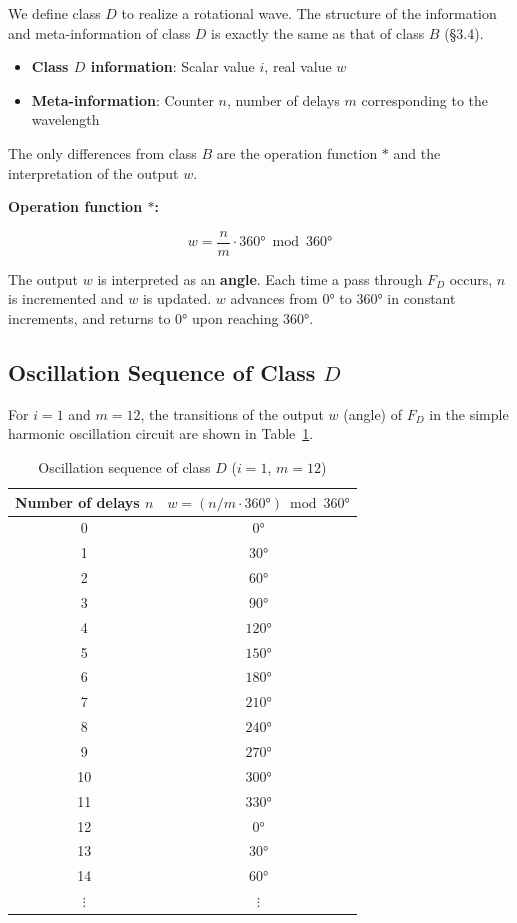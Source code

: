 \documentclass[12pt,a4paper]{article}
\begin{document}
We define class $D$ to realize a rotational wave. The structure of the information and
meta-information of class $D$ is exactly the same as that of class $B$ (\S3.4).

\begin{itemize}
  \item \textbf{Class $D$ information}: Scalar value $i$, real value $w$
  \item \textbf{Meta-information}: Counter $n$, number of delays $m$ corresponding to the
        wavelength
\end{itemize}

The only differences from class $B$ are the operation function $*$ and the interpretation of
the output $w$.

\textbf{Operation function $*$:}

\begin{equation}
  w = \frac{n}{m} \cdot 360° \bmod 360°
\end{equation}

The output $w$ is interpreted as an \textbf{angle}. Each time a pass through $F_D$ occurs,
$n$ is incremented and $w$ is updated. $w$ advances from $0°$ to $360°$ in constant
increments, and returns to $0°$ upon reaching $360°$.

\subsection{Oscillation Sequence of Class $D$}

For $i = 1$ and $m = 12$, the transitions of the output $w$ (angle) of $F_D$ in the simple
harmonic oscillation circuit are shown in Table~\ref{tab:classD}.

\begin{table}[h]
  \centering
  \caption{Oscillation sequence of class $D$ ($i = 1$, $m = 12$)}
  \label{tab:classD}
  \begin{tabular}{cc}
    \toprule
    Number of delays $n$ & $w = (n/m \cdot 360°) \bmod 360°$ \\
    \midrule
    0  & $0°$   \\
    1  & $30°$  \\
    2  & $60°$  \\
    3  & $90°$  \\
    4  & $120°$ \\
    5  & $150°$ \\
    6  & $180°$ \\
    7  & $210°$ \\
    8  & $240°$ \\
    9  & $270°$ \\
    10 & $300°$ \\
    11 & $330°$ \\
    12 & $0°$   \\
    13 & $30°$  \\
    14 & $60°$  \\
    $\vdots$ & $\vdots$ \\
    \bottomrule
  \end{tabular}
\end{table}
\end{document}
